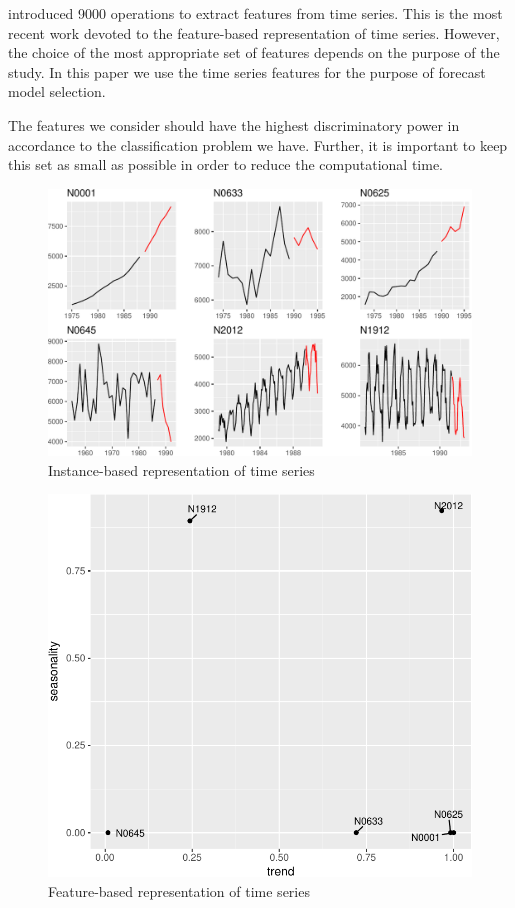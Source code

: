 \documentclass[11pt,a4paper,]{article}
\theoremstyle{definition}
\theoremstyle{definition}
\theoremstyle{definition}
\theoremstyle{remark}
\begin{document}
\textcite{fulcher2014highly} introduced 9000 operations to extract
features from time series. This is the most recent work devoted to the
feature-based representation of time series. However, the choice of the
most appropriate set of features depends on the purpose of the study. In
this paper we use the time series features for the purpose of forecast
model selection.

The features we consider should have the highest discriminatory power in
accordance to the classification problem we have. Further, it is
important to keep this set as small as possible in order to reduce the
computational time.

\begin{figure}

{\centering \includegraphics[width=\textwidth]{figure/fig1-1} 

}

\caption{Instance-based representation of time series}\label{fig:fig1}
\end{figure}

\begin{figure}

{\centering \includegraphics[width=0.7\linewidth]{figure/fig2-1} 

}

\caption{Feature-based representation of time series}\label{fig:fig2}
\end{figure}
\end{document}
